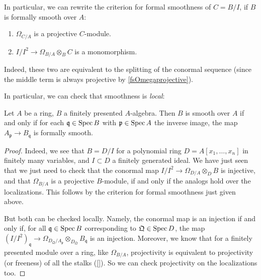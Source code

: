 In particular, we can rewrite the criterion for formal smoothness of $C= B/I$,
if $B$ is formally smooth over $A$:
\begin{enumerate}
\item $\Omega_{C/A} $ is a projective $C$-module.
\item $I/I^2 \to \Omega_{B/A} \otimes_B C$ is a monomorphism.
\end{enumerate}
Indeed, these two are equivalent to the splitting of the conormal sequence
(since the middle term is always projective by \cref{fsOmegaprojective}).

In particular, we can check that smoothness is \emph{local}:
\begin{corollary} \label{fsislocal}
Let $A$ be a ring, $B$ a finitely presented $A$-algebra. Then $B$ is smooth
over $A$ if and only if for each $\mathfrak{q} \in \operatorname{Spec} B$ with $\mathfrak{p}
\in \operatorname{Spec} A$ the inverse image, the map $A_{\mathfrak{p}} \to B_{\mathfrak{q}}$
is formally smooth.
\end{corollary} 
\begin{proof} 
Indeed, we see that $B = D/I$ for a polynomial ring $D = A[x_1,\dots, x_n]$ in finitely many
variables, and $I \subset D$ a finitely generated ideal.
We have just seen that we just need to check that the conormal map $I/I^2 \to
\Omega_{D/A} \otimes_D B$ is injective, and that $\Omega_{B/A}$ is a projective
$B$-module, if and only if the analogs hold over the localizations. This
follows by the criterion for formal smoothness just given above.

But both can be checked locally. Namely, the conormal map is an injection if
and only if, for all $\mathfrak{q} \in \operatorname{Spec} B$ corresponding to $\mathfrak{Q}
\in \operatorname{Spec} D$, the map $(I/I^2)_{\mathfrak{q}} \to
\Omega_{D_{\mathfrak{Q}}/A_{\mathfrak{p}}} \otimes_{D_{\mathfrak{Q}}}
B_{\mathfrak{q}}$ is an injection.
Moreover, we know that for a finitely presented module over a  ring,
like $\Omega_{B/A}$, projectivity is equivalent to projectivity (or freeness) of all the stalks
(\cref{}). So we can check projectivity on the localizations too. 
\end{proof} 

